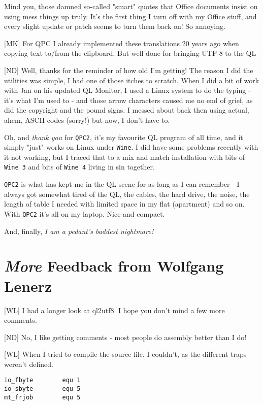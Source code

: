 Mind you, those damned so-called "smart" quotes that Office documents insist on using mess things up truly. It's the first thing I turn off with my Office stuff, and every slight update or patch seems to turn them back on! So annoying.

[MK] For QPC I already implemented these translations 20 years ago when
copying text to/from the clipboard. But well done for bringing UTF-8
to the QL 

[ND] Well, thanks for the reminder of how old I'm getting! The reason I did the utilities was simple, I had one of those itches to scratch. When I did a bit of work with Jan on his updated QL Monitor, I used a Linux system to do the typing - it's what I'm used to - and those arrow characters caused me no end of grief, as did the copyright and the pound signs. I messed about back then using actual, ahem, ASCII codes (sorry!) but now, I don't have to.

Oh, and \emph{thank you} for \texttt{QPC2}, it's my favourite QL program of all time, and it simply "just" works on Linux under  \texttt{Wine}. I did have some problems recently with it not working, but I traced that to a mix and match installation with bits of  \texttt{Wine 3} and bits of  \texttt{Wine 4} living in sin together. 

\texttt{QPC2} is what has kept me in the QL scene for as long as I can remember - I always got somewhat tired of the QL, the cables, the hard drive, the noise, the length of table I needed with limited space in my flat (apartment) and so on. With  \texttt{QPC2} it's all on my laptop. Nice and compact.

And, finally, \emph{I am a pedant's baddest nightmare!}


\section{\emph{More} Feedback from Wolfgang Lenerz}


[WL] I had a longer look at ql2utf8. I hope you don't mind a few more comments.

[ND] No, I like getting comments - most people do assembly better than I do!

[WL] When I tried to compile the source file, I couldn't, as the different traps weren't defined.

\begin{lstlisting}[numbers=none]
io_fbyte        equ 1
io_sbyte        equ 5
mt_frjob        equ 5
\end{lstlisting}


